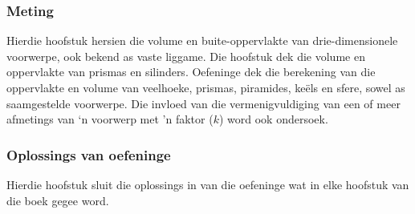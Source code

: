 \subsubsection{Meting}
Hierdie hoofstuk hersien die volume en buite-oppervlakte van drie-dimensionele voorwerpe, ook bekend as vaste liggame. Die hoofstuk dek die volume en oppervlakte van prismas en silinders. Oefeninge dek die berekening van die oppervlakte en volume van veelhoeke, prismas, piramides, keëls en sfere, sowel as saamgestelde voorwerpe. Die invloed van die vermenigvuldiging van een of meer afmetings van ‘n voorwerp met 'n faktor ($k$) word ook ondersoek.

\subsubsection{Oplossings van oefeninge}
Hierdie hoofstuk sluit die oplossings in van die oefeninge wat in elke hoofstuk van die boek gegee word.